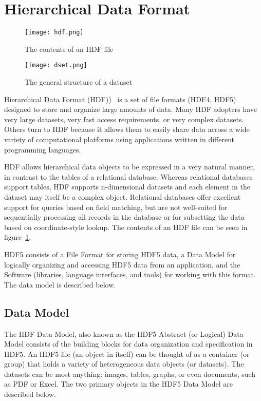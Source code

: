 \section{Hierarchical Data Format}
\label{hdf}
\begin{figure}
	\centerline{\texttt{[image: hdf.png]}}
	\caption{The contents of an HDF file}
	\label{hdf}
\end{figure}
\begin{figure}
	\centerline{\texttt{[image: dset.png]}}
	\caption{The general structure of a dataset}
	\label{dset}
\end{figure}
Hierarchical Data Format (HDF))~\cite{hdf2014hierarchical} is a set of file formats (HDF4, HDF5) designed to store and organize large amounts of data. Many HDF adopters have very large datasets, very fast access requirements, or very complex datasets. Others turn to HDF because it allows them to easily share data across a wide variety of computational platforms using applications written in different programming languages.\par
	HDF allows hierarchical data objects to be expressed in a very natural manner, in contrast to the tables of a relational database.  Whereas relational databases support tables, HDF supports n-dimensional datasets and each element in the dataset may itself be a complex object. Relational databases offer excellent support for queries based on field matching, but are not well-suited for sequentially processing all records in the database or for subsetting the data based on coordinate-style lookup. The contents of an HDF file can be seen in figure~\ref{hdf}.\par
	HDF5 consists of a File Format for storing HDF5 data, a Data Model for logically organizing and accessing HDF5 data from an application, and the Software (libraries, language interfaces, and tools) for working with this format. The data model is described below.
\subsection{Data Model}
The HDF Data Model, also known as the HDF5 Abstract (or Logical) Data Model consists of the building blocks for data organization and specification in HDF5. An HDF5 file (an object in itself) can be thought of as a container (or group) that holds a variety of heterogeneous data objects (or datasets). The datasets can be most anything: images, tables, graphs, or even documents, such as PDF or Excel. The two primary objects in the HDF5 Data Model are described below.


